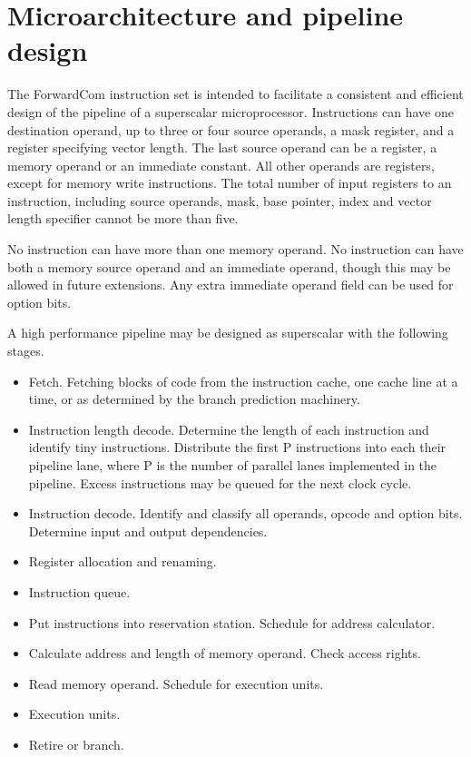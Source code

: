 \documentclass[forwardcom.tex]{subfiles}
\begin{document}
\RaggedRight

\chapter{Microarchitecture and pipeline design}
The ForwardCom instruction set is intended to facilitate a consistent and efficient design of the pipeline of a superscalar microprocessor. Instructions can have one destination operand, up to three or four source operands, a mask register, and a register specifying vector length. The last source operand can be a register, a memory operand or an immediate constant. All other operands are registers, except for memory write instructions. The total number of input registers to an instruction, including source operands, mask, base pointer, index and vector length specifier cannot be more than five.
\vspace{2mm}

No instruction can have more than one memory operand. No instruction can have both a memory source operand and an immediate operand, though this may be allowed in future extensions. Any extra immediate operand field can be used for option bits. 
\vspace{2mm}

A high performance pipeline may be designed as superscalar with the following stages.
\begin{itemize}
\item  Fetch. Fetching blocks of code from the instruction cache, one cache line at a time, or as determined by the branch prediction machinery. 

\item  Instruction length decode. Determine the length of each instruction and identify tiny instructions. Distribute the first P instructions into each their pipeline lane, where P is the number of parallel lanes implemented in the pipeline. Excess instructions may be queued for the next clock cycle. 

\item  Instruction decode. Identify and classify all operands, opcode and option bits. Determine input and output dependencies.

\item  Register allocation and renaming. 

\item  Instruction queue. 

\item  Put instructions into reservation station. Schedule for address calculator. 

\item  Calculate address and length of memory operand. Check access rights.

\item  Read memory operand. Schedule for execution units.  

\item  Execution units.  

\item  Retire or branch. 
\end{itemize}
\end{document}
